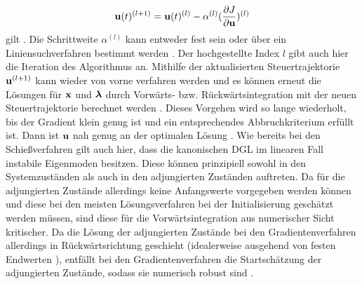 \begin{equation}
\boldsymbol{\mathrm{u}}(t)^{(l+1)} = \boldsymbol{\mathrm{u}}(t)^{(l)} - \alpha^{(l)}(\frac{\partial J}{\partial \boldsymbol{\mathrm{u}}})^{(l)}
\end{equation}
gilt \cite{KnutGraichen.2012}. Die Schrittweite $\alpha^{(l)}$ kann entweder fest sein oder über ein Liniensuchverfahren bestimmt werden \cite{Papageorgiou.2012}. Der hochgestellte Index $l$ gibt auch hier die Iteration des Algorithmus an. Mithilfe der aktualisierten Steuertrajektorie $\boldsymbol{\mathrm{u}}^{(l+1)}$ kann wieder von vorne verfahren werden und es können erneut die Lösungen für $\boldsymbol{\mathrm{x}}$ und $\boldsymbol{\mathrm{\lambda}}$ durch Vorwärts- bzw. Rückwärtsintegration mit der neuen Steuertrajektorie berechnet werden \cite{Papageorgiou.2012}. Dieses Vorgehen wird so lange wiederholt, bis der Gradient klein genug ist und ein entsprechendes Abbruchkriterium erfüllt ist. Dann ist $\boldsymbol{\mathrm{u}}$ nah genug an der optimalen Lösung \cite{Papageorgiou.2012}. Wie bereits bei den Schießverfahren gilt auch hier, dass die kanonischen \gls{DGL} im linearen Fall instabile Eigenmoden besitzen. Diese können prinzipiell sowohl in den Systemzuständen als auch in den adjungierten Zuständen auftreten. Da für die adjungierten Zustände allerdings keine Anfangswerte vorgegeben werden können und diese bei den meisten Lösungsverfahren bei der Initialisierung geschätzt werden müssen, sind diese für die Vorwärtsintegration aus numerischer Sicht kritischer. Da die Lösung der adjungierten Zustände bei den Gradientenverfahren allerdings in Rückwärtsrichtung geschieht (idealerweise ausgehend von festen Endwerten \lambdaoftf), entfällt bei den Gradientenverfahren die Startschätzung der adjungierten Zustände, sodass sie numerisch robust sind \cite{KnutGraichen.2012}.
\newpage
